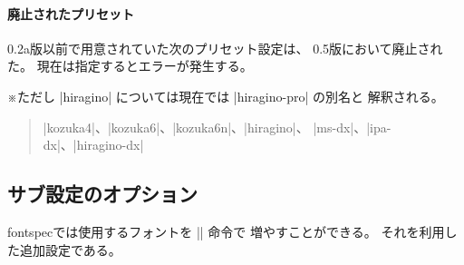 \documentclass[xelatex,ja=standard,jafont=ipaex,
  a4paper]{bxjsarticle}
\newcommand{\Pkg}[1]{\textsf{#1}}
\newcommand{\Note}{\par\noindent ※}
\begin{document}
\paragraph{廃止されたプリセット}

0.2a版以前で用意されていた次のプリセット設定は、
0.5版において廃止された。
現在は指定するとエラーが発生する。

\Note ただし |hiragino| については現在では |hiragino-pro| の別名と
解釈される。

\begin{quote}
|kozuka4|、|kozuka6|、|kozuka6n|、|hiragino|、
|ms-dx|、|ipa-dx|、|hiragino-dx|
\end{quote}

\subsection{サブ設定のオプション}
\label{ssec:Sub-Option}

\Pkg{fontspec}では使用するフォントを |\newfontfamily| 命令で
増やすことができる。
それを利用した追加設定である。
\end{document}
